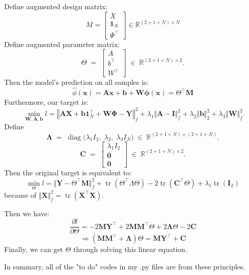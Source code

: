 \documentclass[11pt,letter,notitlepage]{article}
\begin{document}
\begin{solution}
\begin{enumerate}
	Define augmented design matrix:
	\[
	M = 
	\begin{bmatrix}
	X \\[4pt]
	\mathbf{1}_N \\[4pt]
	\Phi^{\top}
	\end{bmatrix}
	\in \mathbb{R}^{(2+1+N)\times N}
	\]
	Define augmented parameter matrix:
	\[
	\Theta \;=\;
	\begin{bmatrix}
	A \\[4pt]
	b^{\top} \\[4pt]
	W^{\top}
	\end{bmatrix}
	\;\in\; \mathbb{R}^{(2+1+N)\times 2}.
	\]
	Then the model's prediction on all samples is:
	\[
	\hat{\phi}(\mathbf{x})
	=
	\mathbf{A}\mathbf{x} + \mathbf{b} + \mathbf{W} \boldsymbol{\phi}(\mathbf{x})
	=
	\Theta^\top \mathbf{M}
	\]
	Furthermore, our target is:
	\[
	\min_{\mathbf{W}, \mathbf{A}, \mathbf{b}} l
	=
	\left\Vert \mathbf{A}\mathbf{X} + \mathbf{b}\mathbf{1}_N^\top + \mathbf{W} \mathbf{\Phi} - \mathbf{Y} \right\Vert _f^2
	+
	\lambda_1\Vert \mathbf{A} - \mathbf{I}\Vert_f^2
	+
	\lambda_2 \Vert\mathbf{b} \Vert _2^2
	+
	\lambda_3\Vert \mathbf{W}\Vert_f^2
	\]
	Define
	\[
	\mathbf{\Lambda} \;=\;
	\operatorname{diag}\!\big(
	\lambda_{1} I_{2},\;
	\lambda_{2},\;
	\lambda_{3} I_{N}
	\big)
	\;\in\;
	\mathbb{R}^{(2+1+N)\times(2+1+N)}.
	\]
	\[
	\mathbf{C} \;=\;
	\begin{bmatrix}
	\lambda_{1} I_{2} \\[4pt]
	\mathbf{0} \\[4pt]
	\mathbf{0}
	\end{bmatrix}
	\;\in\;
	\mathbb{R}^{(2+1+N)\times 2}.
	\]
	Then the original target is equivalent to:
	\[
	\min_{\Theta} l
	=
	\Vert \mathbf{Y} - \Theta^\top \mathbf{M} \Vert_{f}^2
	+
	\operatorname{tr}\left(\Theta^\top \Lambda \Theta\right)
	-
	2 \operatorname{tr}\left(\mathbf{C}^\top \Theta\right)
	+
	\lambda_1 \operatorname{tr}(\mathbf{I}_2)
	\]
	because of $\Vert \mathbf{X} \Vert_{f}^2 = \operatorname{tr} \left(\mathbf{X}^\top \mathbf{X}\right)$.

	Then we have:
	\[
	\frac{\partial l}{\partial \Theta}
	=
	-2 \mathbf{M} \mathbf{Y}^\top
	+
	2 \mathbf{M} \mathbf{M}^\top \Theta
	+
	2 \mathbf{\Lambda} \Theta
	-
	2 \mathbf{C}
	\]
	\[
	\Longrightarrow
	\left(\mathbf{M} \mathbf{M}^\top + \mathbf{\Lambda}\right) \Theta
	=
	\mathbf{M} \mathbf{Y}^\top
	+
	\mathbf{C}
	\]
	Finally, we can get $\Theta$ through solving this linear equation.

	In summary, all of the "to do" codes in my .py files are from these principles.


\end{enumerate}
\end{solution}
\end{document}
